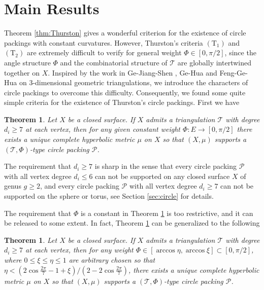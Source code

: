 \documentclass[12pt]{amsart}
\numberwithin{equation}{section}
\newtheorem{theo}[prop]{Theorem}
\begin{document}
\section{Main Results}

Theorem \ref{thm:Thurston} gives a wonderful criterion for the existence of circle packings with constant curvatures.
However, Thurston's criteria $(\mathrm{T}_1)$ and $(\mathrm{T}_2)$ are extremely difficult to verify for general weight $\Phi \in [0,\pi/2]$,
since the angle structure $\Phi$ and the combinatorial structure of $\mathcal{T}$ are globally intertwined together on $X$.
Inspired by the work in Ge-Jiang-Shen \cite{GeJiangShen}, Ge-Hua \cite{GeHua} and Feng-Ge-Hua \cite{FengGeHua} on 3-dimensional geometric
triangulations, we introduce the characters of circle packings to overcome this difficulty. Consequently,
we found some quite simple criteria for the existence of Thurston's circle packings. First we have

\begin{theo}\label{thm:main1}
Let $X$ be a closed surface. If $X$ admits a triangulation $\mathcal{T}$ with degree $d_i \geq 7$ at each
vertex, then for any given constant weight $\Phi : E \to [0,\pi/2]$ there exists a unique complete hyperbolic
metric $\mu$ on $X$ so that $(X,\mu)$ supports a $(\mathcal{T},\Phi)$-type circle packing $\mathcal{P}$.
\end{theo}

The requirement that $d_i \geq 7$ is sharp in the sense that every circle packing $\mathcal{P}$ with all vertex degree
$d_i \leq 6$ can not be supported on any closed surface $X$ of genus $g \geq 2$, and every circle packing $\mathcal{P}$ with all
vertex degree $d_i \geq 7$ can not be supported on the sphere or torus, see Section \ref{sec:circle} for details.

The requirement that $\Phi$ is a constant in Theorem \ref{thm:main1} is too restrictive, and it can be released to some
extent. In fact, Theorem \ref{thm:main1} can be generalized to the following

\begin{theo}\label{thm:main2}
Let $X$ be a closed surface. If $X$ admits a triangulation $\mathcal{T}$ with degree $d_i \geq 7$ at each
vertex, then for any weight $\Phi \in [\arccos\eta, \arccos\xi] \subset [0,\pi/2]$, where $0 \leq \xi \leq \eta \leq 1$ are arbitrary chosen
so that $\eta < (2\cos\frac{2\pi}{7} - 1 + \xi)/(2 - 2\cos\frac{2\pi}{7})$, there exists a unique complete hyperbolic metric $\mu$ on $X$ so
that $(X,\mu)$ supports a $(\mathcal{T},\Phi)$-type circle packing $\mathcal{P}$.
\end{theo}
\end{document}
